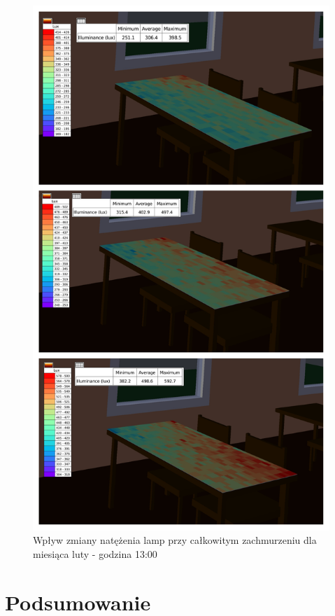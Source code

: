 \documentclass[a4paper,12pt]{article}
\begin{document}
	\begin{figure}[!h]
		\includegraphics[scale=0.8]{wplyw_natezenia}
		\centering
		\caption{Wpływ zmiany natężenia lamp przy całkowitym zachmurzeniu dla miesiąca luty - godzina 13:00}
		\label{fig:wplyw_natezenia_symulacja}
	\end{figure}


	
	\section{Podsumowanie}
	\label{sec:podsumowanie}		
\end{document}
